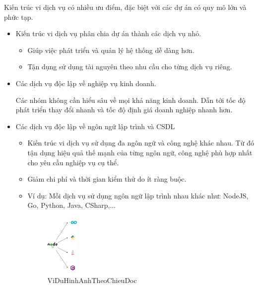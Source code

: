 Kiến trúc vi dịch vụ có nhiều ưu điểm, đặc biệt với các dự án có quy mô lớn và phức tạp.

\begin{itemize}

\item Kiến trúc vi dịch vụ phân chia dự án thành các dịch vụ nhỏ.

\begin{itemize}

\item Giúp việc phát triển và quản lý hệ thống dễ dàng hơn.

\item Tận dụng sử dụng tài nguyên theo nhu cầu cho từng dịch vụ riêng.

\end{itemize}

\item Các dịch vụ độc lập về nghiệp vụ kinh doanh.

Các nhóm không cần hiểu sâu về mọi khả năng kinh doanh. Dẫn tới tốc độ phát triển thay đổi nhanh và tốc độ định giá doanh nghiệp nhanh hơn.

\item Các dịch vụ độc lập về ngôn ngữ lập trình và CSDL

\begin{itemize}

\item Kiến trúc vi dịch vụ sử dụng đa ngôn ngữ và công nghệ khác nhau. Từ đó tận dụng hiệu quả thế mạnh của từng ngôn ngữ, công nghệ phù hợp nhất cho yêu cầu nghiệp vụ cụ thể.

\item Giảm chi phí và thời gian kiểm thử do ít ràng buộc.

\item Ví dụ: Mỗi dịch vụ sử dụng ngôn ngữ lập trình nhau khác như: NodeJS, Go, Python, Java, CSharp,...

\begin{figure}[h]

\centering

\includegraphics[height = 3cm]{pictures/DaNgonNgu/_DaNgonNgu.png}

\caption{ViDuHinhAnhTheoChieuDoc}


\end{figure}

\end{itemize}

\end{itemize}

